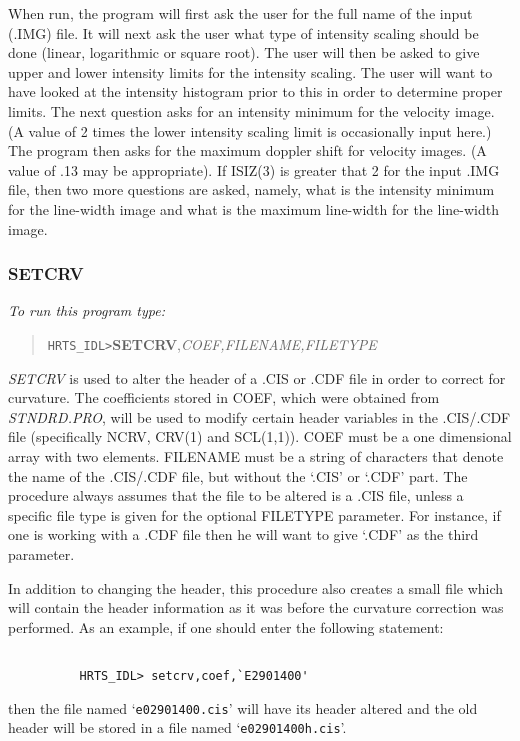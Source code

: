       When run, the program will first ask the user for the full name of
   the input (.IMG) file.  It will next ask the user what type of
   intensity scaling should be done (linear, logarithmic or square root).
   The user will then be asked to give upper and lower intensity limits
   for the intensity scaling.  The user will want to have looked at the
   intensity histogram prior to this in order to determine proper limits.
   The next question asks for an intensity minimum for the velocity image.
   (A value of 2 times the lower intensity scaling limit is occasionally
   input here.)  The program then asks for the maximum doppler shift
   for velocity images.  (A value of .13 may be appropriate).  If ISIZ(3)
   is greater that 2 for the input .IMG file, then two more questions are
   asked, namely, what is the intensity minimum for the line-width image
   and what is the maximum line-width for the line-width image.

\subsubsection{SETCRV}

{\em To run this program type:}

\begin{quote}
     {\tt HRTS\_IDL>}{\bf SETCRV},{\it COEF,FILENAME,FILETYPE}
\end{quote}
{\em SETCRV} is used to alter the header of a .CIS or .CDF file in order
   to correct for curvature.  The coefficients stored in COEF, which were
   obtained from {\em STNDRD.PRO}, will be used to modify certain header
   variables in the .CIS/.CDF file (specifically NCRV, CRV(1) and
   SCL(1,1)).  COEF must be a one dimensional array with two elements.
   FILENAME must be a string of characters that denote the name of the
   .CIS/.CDF file, but without the `.CIS' or `.CDF' part.  The procedure
   always assumes that the file to be altered is a .CIS file, unless a
   specific file type is given for the optional FILETYPE parameter.  For
   instance, if one is working with a .CDF file then he will want to give
   `.CDF' as the third parameter.

      In addition to changing the header, this procedure also creates a
   small file which will contain the header information as it was before
   the curvature correction was performed.  As an example, if one should
   enter the following statement:
\begin{verbatim}

          HRTS_IDL> setcrv,coef,`E2901400'

\end{verbatim}
   then the file named `{\tt e02901400.cis}' will have
   its header altered and the old header will be stored in a file named
   `{\tt e02901400h.cis}'.

